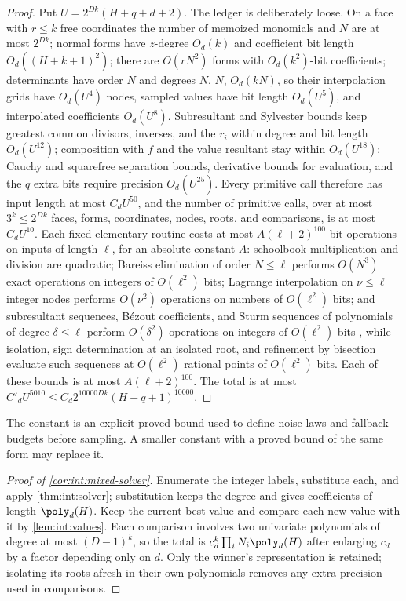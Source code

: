 \begin{proof}
Put $U=2^{Dk}(H+q+d+2)$. The ledger is deliberately loose. On a face with
$r\le k$ free coordinates the number of memoized monomials and $N$ are at most
$2^{Dk}$; normal forms have $z$-degree $O_d(k)$ and coefficient bit length
$O_d((H+k+1)^2)$; there are $O(rN^2)$ forms with $O_d(k^2)$-bit coefficients;
determinants have order $N$ and degrees $N$, $N$, $O_d(kN)$, so their
interpolation grids have $O_d(U^4)$ nodes, sampled values have bit length
$O_d(U^5)$, and interpolated coefficients $O_d(U^8)$. Subresultant and Sylvester
bounds keep greatest common divisors, inverses, and the $r_i$ within degree and
bit length $O_d(U^{12})$; composition with $f$ and the value resultant stay
within $O_d(U^{18})$; Cauchy and squarefree separation bounds, derivative bounds
for evaluation, and the $q$ extra bits require precision $O_d(U^{25})$. Every
primitive call therefore has input length at most $C_dU^{50}$, and the number of
primitive calls, over at most $3^k\le2^{Dk}$ faces, forms, coordinates, nodes,
roots, and comparisons, is at most $C_dU^{10}$. Each fixed elementary routine
costs at most $A(\ell+2)^{100}$ bit operations on inputs of length $\ell$, for an
absolute constant $A$: schoolbook multiplication and division are quadratic;
Bareiss elimination of order $N\le\ell$ performs $O(N^3)$ exact operations on
integers of $O(\ell^2)$ bits; Lagrange interpolation on $\nu\le\ell$ integer
nodes performs $O(\nu^2)$ operations on numbers of $O(\ell^2)$ bits; and
subresultant sequences, B\'ezout coefficients, and Sturm sequences of
polynomials of degree $\delta\le\ell$ perform $O(\delta^2)$ operations on
integers of $O(\ell^2)$ bits \citep{basu2006-algorithms-in-real-algebraic-geometry}, while isolation, sign
determination at an isolated root, and refinement by bisection evaluate
such sequences at $O(\ell^2)$ rational points of $O(\ell^2)$ bits. Each of
these bounds is at most $A(\ell+2)^{100}$. The total is at most
$C'_dU^{5010}\le C_d2^{10000Dk}(H+q+1)^{10000}$.
\end{proof}

The constant is an explicit proved bound used to define noise laws and fallback
budgets before sampling. A smaller constant with a proved bound of the same form
may replace it.

\begin{proof}[Proof of \cref{cor:int:mixed-solver}]
Enumerate the integer labels, substitute each, and apply \cref{thm:int:solver};
substitution keeps the degree and gives coefficients of length $\poly_d(H)$.
Keep the current best value and compare each new value with it by
\cref{lem:int:values}. Each comparison involves two univariate polynomials of
degree at most $(D-1)^k$, so the total is $c_d^k\prod_iN_i\poly_d(H)$ after
enlarging $c_d$ by a factor depending only on $d$. Only the winner's
representation is retained; isolating its roots afresh in their own polynomials
removes any extra precision used in comparisons.
\end{proof}

